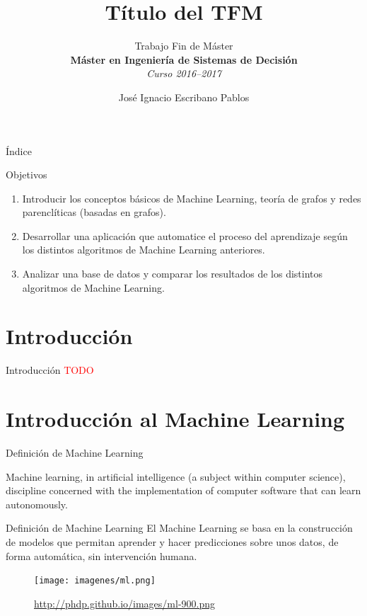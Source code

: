 \documentclass[hyperref={unicode}]{beamer}
\title{Título del TFM}
\subtitle{Trabajo Fin de Máster \\ \textbf{Máster en Ingeniería de Sistemas de Decisión} \\ \textit{Curso 2016--2017}}
\author{José Ignacio Escribano Pablos}
\institute{\begin{tabular}{c}
Ana Elizabeth García Sipols \\
Miguel Romance del Río     
\end{tabular}}
\begin{document}
\setcounter{showProgressBar}{0}
\setcounter{showSlideNumbers}{0}

\frame{\titlepage}

\begin{frame}{Índice}
	\tableofcontents
\end{frame}

\setcounter{framenumber}{0}
\setcounter{showProgressBar}{1}
\setcounter{showSlideNumbers}{1}

\begin{frame}{Objetivos}
	\begin{enumerate}
		\item Introducir los conceptos básicos de Machine Learning, teoría de grafos y redes parenclíticas (basadas en grafos).
		
		\item \pause Desarrollar una aplicación que automatice el proceso del aprendizaje según los distintos algoritmos de Machine Learning anteriores.
		
		\item \pause Analizar una base de datos y comparar los resultados de los distintos algoritmos de Machine Learning.
	\end{enumerate}
\end{frame}

\section{Introducción}
\begin{frame}{Introducción}
	\Huge{\textcolor{red}{TODO}}
\end{frame}

\section{Introducción al Machine Learning}
\begin{frame}{Definición de Machine Learning}
	\begin{fancyquotes}
		Machine learning, in artificial intelligence (a subject within computer science), discipline concerned with the implementation of computer software that can learn autonomously.
	\end{fancyquotes}
\end{frame}

\begin{frame}{Definición de Machine Learning}
	El Machine Learning se basa en la construcción de modelos que permitan aprender y hacer predicciones sobre unos datos, de forma automática, sin intervención humana.\\
	
	\begin{figure}
		\begin{center}
		\texttt{[image: imagenes/ml.png]}
		\caption{\url{http://phdp.github.io/images/ml-900.png}}
		\end{center}
	\end{figure}

\end{frame}
\end{document}
